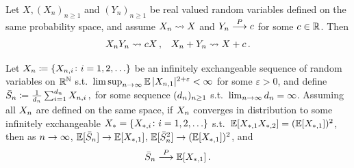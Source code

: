 \begin{lemma}\label{lem:slutsky}
    Let $X, (X_n)_{n \geq 1}$ and $(Y_n)_{n \geq 1}$ be real valued random variables defined on the same probability space, and assume $X_n \rightsquigarrow X$ and $Y_n \overset{P}{\longrightarrow} c$ for some $c \in \mathbb{R}^{}$.
    Then
    \begin{align}
        &X_n Y_n \rightsquigarrow c X
        \, ,
        &X_n + Y_n \rightsquigarrow X + c
        \, .
    \end{align}
\end{lemma}



\begin{lemma}\label{lem:wlln_exch}
    Let 
    $X_n \coloneqq \{ X_{n, i} \colon i = 1, 2, \ldots \}$
    be an infinitely exchangeable sequence of random variables on $\mathbb{R}^{\mathbb{N}}$ 
    s.t.\ $\limsup_{n \to \infty} \operatorname*{\mathbb{E}}  |X_{n, 1}|^{2 + \varepsilon} < \infty$ for some $\varepsilon > 0$, and
    define
    $
        \bar{S}_{n} 
        \coloneqq
        \frac{1}{d_n}
        \sum_{i=1}^{d_n} 
            X_{n, i} 
        \, , 
    $
    for some sequence $(d_n)_{n \geq 1}$ s.t.\ $\lim_{n \to \infty} d_n = \infty$.
    Assuming all $X_{n}$ are defined on the same space, if $X_{n}$ converges in distribution to some infinitely exchangeable $X_{*} = \{ X_{*, i} \colon i = 1, 2, \ldots \}$ s.t.\ $\operatorname*{\mathbb{E}} [X_{*, 1} X_{* , 2}] = (\operatorname*{\mathbb{E}} [ X_{*, 1} ] )^2$,
    then as $n \to \infty$,
    $\operatorname*{\mathbb{E}} [\bar{S}_{n} ] \to \operatorname*{\mathbb{E}} [X_{*, 1}]$, 
    $\operatorname*{\mathbb{E}} [\bar{S}_{n}^2 ] \to (\operatorname*{\mathbb{E}} [X_{*, 1}] )^2$, and
    $$\bar{S}_{n} \overset{P}{\longrightarrow} \operatorname*{\mathbb{E}} [X_{*, 1}] \, .$$
\end{lemma}


